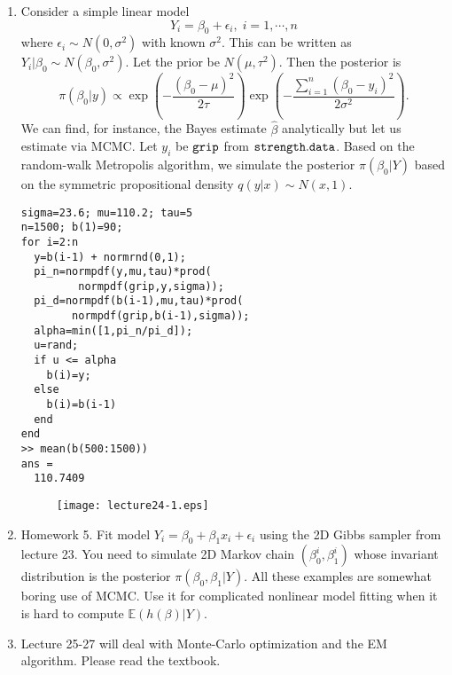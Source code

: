 \documentclass[11pt,twocolumn]{article} %
\begin{document}
\begin{enumerate}
\item Consider a simple linear model $$Y_i = \beta_0 + \epsilon_i, \; i=1,\cdots,n$$ where $\epsilon_i \sim N(0,\sigma^2)$ with known $\sigma^2$. This can be written as $Y_i|\beta_0 \sim N(\beta_0, \sigma^2)$. Let the prior be $N(\mu,\tau^2)$. Then the posterior is
$$\pi(\beta_0|y) \propto \exp(-\frac{(\beta_0-\mu)^2}{2\tau})\exp(-\frac{\sum_{i=1}^n(\beta_0-y_i)^2}{2\sigma^2}).$$
We can find, for instance, the Bayes estimate $\hat \beta$ analytically but let us estimate via MCMC. Let $y_i$ be $\tt{grip}$ from $\tt{strength.data}$. Based on the random-walk Metropolis algorithm, we simulate the posterior $\pi(\beta_0|Y)$ based on the symmetric propositional density $q(y|x) \sim N(x,1)$.
\begin{verbatim}
sigma=23.6; mu=110.2; tau=5
n=1500; b(1)=90;
for i=2:n
  y=b(i-1) + normrnd(0,1);
  pi_n=normpdf(y,mu,tau)*prod(
         normpdf(grip,y,sigma));
  pi_d=normpdf(b(i-1),mu,tau)*prod(
        normpdf(grip,b(i-1),sigma));
  alpha=min([1,pi_n/pi_d]);
  u=rand;
  if u <= alpha
    b(i)=y;
  else
    b(i)=b(i-1)
  end
end
>> mean(b(500:1500)) 
ans =
  110.7409
\end{verbatim}
\begin{figure}
\centering
\renewcommand{\baselinestretch}{1}
\texttt{[image: lecture24-1.eps]}
\end{figure}
\item Homework 5. Fit model $Y_i =\beta_0 + \beta_1x_i + \epsilon_i$ using the 2D Gibbs sampler from lecture 23. You need to simulate 2D Markov chain $(\beta_0^i,\beta_1^i)$ whose invariant distribution is the posterior $\pi(\beta_0,\beta_1|Y)$. All these examples are somewhat boring use of MCMC. Use it for complicated nonlinear model fitting when it is hard to compute $\mathbb{E}(h(\beta)|Y)$. 

\item Lecture 25-27 will deal with Monte-Carlo optimization and the EM algorithm. Please read the textbook.
\end{enumerate}
\end{document}
